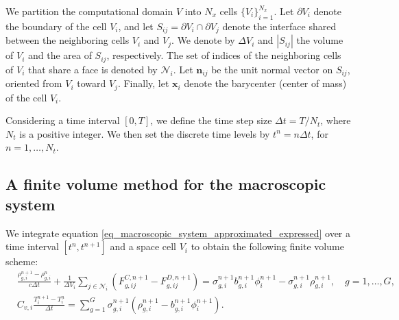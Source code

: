 \documentclass[preprint,12pt]{elsarticle}
\theoremstyle{definition}
\theoremstyle{plain}
\numberwithin{equation}{section}
\numberwithin{algorithm}{section}
\newcounter{eq_count}
\newcounter{subeq_count}
\begin{document}
We partition the computational domain $V$ into $N_x$ cells $\{V_i\}_{i=1}^{N_x}$. 
Let $\partial V_i$ denote the boundary of the cell $V_i$, and let $S_{ij} = \partial V_i \cap \partial V_j$ denote the interface shared between the neighboring cells $V_i$ and $V_j$. 
We denote by $\Delta V_i$ and $|S_{ij} | $ the volume of $V_i$ and the area of $S_{ij}$, respectively. 
The set of indices of the neighboring cells of $V_i$ that share a face is denoted by $\mathcal{N}_i$. 
Let $\mathbf{n}_{ij}$ be the unit normal vector on $S_{ij}$, oriented from $V_i$ toward $V_j$. 
Finally, let $\mathbf{x}_i$ denote the barycenter (center of mass) of the cell $V_i$.

Considering a time interval $[0, T]$, we define the time step size $\Delta t = T / N_t$, where $N_t$ is a positive integer. 
We then set the discrete time levels by $t^n = n \Delta t$, for $n = 1, \ldots, N_t$.

\subsection{A finite volume method for the macroscopic system}
We integrate equation \eqref{eq_macroscopic_system_approximated_expressed} over a time interval $[t^n,t^{n+1}]$ and a space cell $V_i$ to obtain the following finite volume scheme:
\begin{subequations} \label{eq_fullDiscretization} 
		\begin{align} 
			&\frac{\rho_{g,i}^{n+1} - \rho_{g,i}^{n}}{c \Delta t} +  \frac{1}{\Delta V_i}  \sum_{j \in \mathcal{N}_i} \left( F_{g,ij}^{C,n+1} - F_{g,ij}^{D,n+1} \right) =  \sigma_{g,i}^{n+1}b_{g,i}^{n+1}  \phi_i^{n+1} -\sigma_{g,i}^{n+1}\rho_{g,i}^{n+1},  \quad g=1,\ldots,G, \label{eq_fullDiscretization_A} 
            \\  
		  &C_{v,i} \frac{T^{n+1}_i - T^n_i}{\Delta t}=\sum_{g=1}^{G} \sigma_{g,i}^{n+1} \left( \rho_{g,i}^{n+1}- b_{g,i}^{n+1}  \phi_i^{n+1} \right) .\label{eq_fullDiscretization_B} 
		\end{align}
    \end{subequations} 
\end{document}
